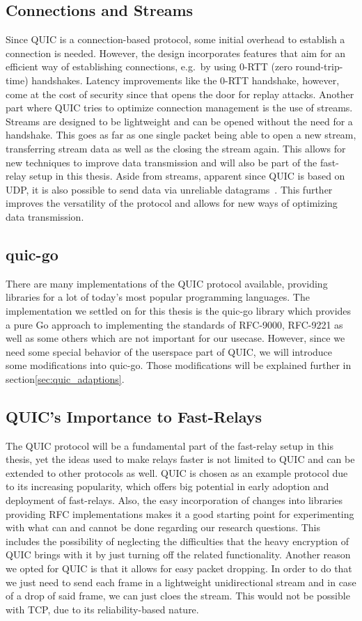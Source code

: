 \subsection{Connections and Streams}
Since QUIC is a connection-based protocol, some initial overhead to establish a connection is needed.
However, the design incorporates features that aim for an efficient way of establishing 
connections, e.g.\ by using 0-RTT (zero round-trip-time) handshakes.
Latency improvements like the 0-RTT handshake, however, come at the cost of security since that opens 
the door for replay attacks.
Another part where QUIC tries to optimize connection management is the use of streams.
Streams are designed to be lightweight and can be opened without the need for a handshake.
This goes as far as one single packet being able to open a new stream, transferring stream data
as well as the closing the stream again.
This allows for new techniques to improve data transmission and will also be part of the fast-relay 
setup in this thesis.
Aside from streams, apparent since QUIC is based on UDP, it is also possible to send data via
unreliable datagrams~\parencite{rfc-9221}.
This further improves the versatility of the protocol and allows for new ways of optimizing data transmission.

\subsection{quic-go}
There are many implementations of the QUIC protocol available, providing libraries for a lot of 
today's most popular programming languages.
The implementation we settled on for this thesis is the quic-go library which provides a pure Go 
approach to implementing the standards of RFC-9000, RFC-9221 as well as some others which are not 
important for our usecase. 
However, since we need some special behavior of the userspace part of QUIC, we will introduce some 
modifications into quic-go.  
Those modifications will be explained further in section\nobreakspace\ref{sec:quic_adaptions}.

\subsection{QUIC's Importance to Fast-Relays}
The QUIC protocol will be a fundamental part of the fast-relay setup in this thesis, yet the ideas used 
to make relays faster is not limited to QUIC and can be extended to other protocols as well.
QUIC is chosen as an example protocol due to its increasing popularity, which offers big potential 
in early adoption and deployment of fast-relays.
Also, the easy incorporation of changes into libraries providing RFC implementations makes it a good 
starting point for experimenting with what can and cannot be done regarding our research questions.
This includes the possibility of neglecting the difficulties that the heavy encryption of QUIC brings with 
it by just turning off the related functionality.
Another reason we opted for QUIC is that it allows for easy packet dropping.
In order to do that we just need to send each frame in a lightweight unidirectional stream and in 
case of a drop of said frame, we can just cloes the stream.
This would not be possible with TCP, due to its reliability-based nature.

